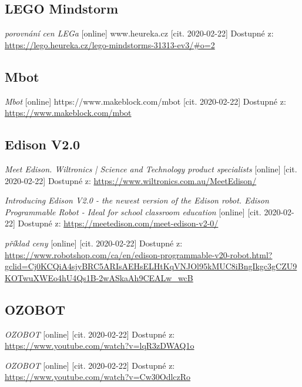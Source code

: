 \documentclass{template/socthesis}
\begin{document}
\listoftables
{}
\renewcommand{\refname}{Další zdroje}
\begin{thebibliography}{1}
	
	\subsection*{LEGO Mindstorm}
	
	\textit{porovnání cen LEGa} [online] www.heureka.cz [cit. 2020-02-22] Dostupné z: \\ 
	\url{https://lego.heureka.cz/lego-mindstorms-31313-ev3/#o=2}
	
	
	\subsection*{Mbot}
	\textit{Mbot} [online] https://www.makeblock.com/mbot [cit. 2020-02-22] Dostupné z: \url{https://www.makeblock.com/mbot}
	
	
	\subsection*{Edison V2.0}
	\textit{Meet Edison. Wiltronics | Science and Technology product specialists} [online] [cit. 2020-02-22] Dostupné z: \url{https://www.wiltronics.com.au/MeetEdison/}
	
	\textit{Introducing Edison V2.0 - the newest version of the Edison robot. Edison Programmable Robot - Ideal for school classroom education} [online] [cit. 2020-02-22] Dostupné z:
	\url{https://meetedison.com/meet-edison-v2-0/}
	
	\textit{příklad ceny} [online] [cit. 2020-02-22] Dostupné z: \\ 
	\url{https://www.robotshop.com/ca/en/edison-programmable-v20-robot.html?gclid=Cj0KCQiA4sjyBRC5ARIsAEHsELHtKqVNJOl95kMUC8iBngIkgc3gCZU9KOTwuXWEo4hU4Qs1B-2wASkaAh9CEALw_wcB}
	
	\subsection*{OZOBOT}
	
	\textit{OZOBOT} [online] [cit. 2020-02-22] Dostupné z:
	\url{https://www.youtube.com/watch?v=lqR3zDWAQ1o}
	
	\textit{OZOBOT} [online] [cit. 2020-02-22] Dostupné z:
	\url{https://www.youtube.com/watch?v=Cw30OdlczRo}
	

\end{thebibliography}
\end{document}

